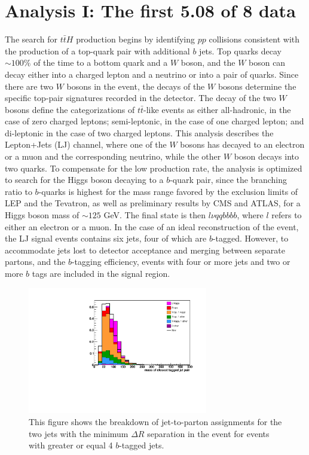 \chapter{Analysis I: The first 5.08 \fbinv of 8 \TeV data}
\label{analysis_1_overview}

\par The search for $t\bar{t}H$ production begins by identifying $pp$
collisions consistent with the production of a top-quark pair with
additional $b$ jets.  Top quarks decay $\sim100\%$ of the time to a
bottom quark and a $W$ boson, and the $W$ boson can decay either into
a charged lepton and a neutrino or into a pair of quarks.  Since there are two $W$ bosons in
the event, the decays of the $W$ bosons determine the specific
top-pair signatures recorded in the detector.  The decay of the two
$W$ bosons define the categorizations of $t\bar{t}$-like events as
either all-hadronic, in the case of zero charged leptons;
semi-leptonic, in the case of one charged lepton; and di-leptonic in the case of two
charged leptons.  This analysis describes the Lepton+Jets (LJ)
channel, where one of the $W$ bosons has decayed to an 
electron or a muon and the corresponding neutrino, while the other $W$
boson decays into two quarks.  To compensate for the low production
rate, the analysis is optimized to search for the Higgs boson decaying
to a $b$-quark pair, since the branching ratio to $b$-quarks is
highest for the mass range favored by the exclusion limits of LEP and
the Tevatron, as well as preliminary results by CMS and ATLAS, for a
Higgs boson mass of $\sim125$ GeV.  The final state is then $l \nu qqbbbb$, where
$l$ refers to either an electron or a muon.  In the case of an ideal
reconstruction of the event, the LJ signal events contains six jets,
four of which are $b$-tagged. However, to accommodate jets lost to
detector acceptance and merging between separate partons, and the
$b$-tagging efficiency, events with four or more jets and two or more
$b$ tags are included in the signal region.  

\begin{figure}[h]
  \centering
  \includegraphics[width=0.7\textwidth]{Figures/Analysis_1_Diagrams/h_closestDR_mass_tag_tag_ge4t_rebin.pdf}
  \caption{This figure shows the breakdown of jet-to-parton
   assignments for the two jets with the minimum $\Delta R$
  separation in the event for events with greater or equal 4
  $b$-tagged jets.}\label{fig:tagMassCombinatorics}  
\end{figure}

